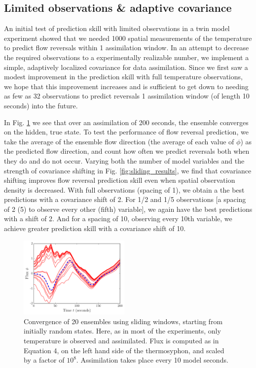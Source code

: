 \documentclass[pre,twocolumn,twoside,byrevtex,superscriptaddress]{revtex4}
\begin{document}
\subsection*{Limited observations \& adaptive covariance}

An initial test of prediction skill with limited observations in a twin model experiment showed that we needed 1000 spatial measurements of the temperature to predict flow reversals within 1 assimilation window.
In an attempt to decrease the required observations to a experimentally realizable number, we implement a simple, adaptively localized covariance for data assimilation.
Since we first saw a modest improvement in the prediction skill with full temperature observations, we hope that this improvement increases and is sufficient to get down to needing as few as 32 observations to predict reversals 1 assimilation window (of length 10 seconds) into the future.

In Fig. \ref{fig:sliding_spag} we see that over an assimilation of 200 seconds, the ensemble converges on the hidden, true state.
To test the performance of flow reversal prediction, we take the average of the ensemble flow direction (the average of each value of $\phi$) as the predicted flow direction, and count how often we predict reversals both when they do and do not occur.
Varying both the number of model variables and the strength of covariance shifting in Fig. \ref{fig:sliding_results}, we find that covariance shifting improves flow reversal prediction skill even when spatial observation density is decreased.
With full observations (spacing of 1), we obtain a the best predictions with a covariance shift of 2.
For 1/2 and 1/5 observations [a spacing of 2 (5) to observe every other (fifth) variable], we again have the best predictions with a shift of 2.
And for a spacing of 10, observing every 10th variable, we achieve greater prediction skill with a covariance shift of 10.

\begin{figure}[h]
  \centering
  \includegraphics[width=0.48\textwidth]{fig08_2015-10-12-09-36-loop-spaghetti.pdf}
  \caption[]{
    Convergence of 20 ensembles using sliding windows, starting from initially random states.
    Here, as in most of the experiments, only temperature is observed and assimilated.
    Flux is computed as in Equation 4, on the left hand side of the thermosyphon, and scaled by a factor of $10^8$.
    Assimilation takes place every 10 model seconds.
  }
  \label{fig:sliding_spag}
\end{figure}
\end{document}
